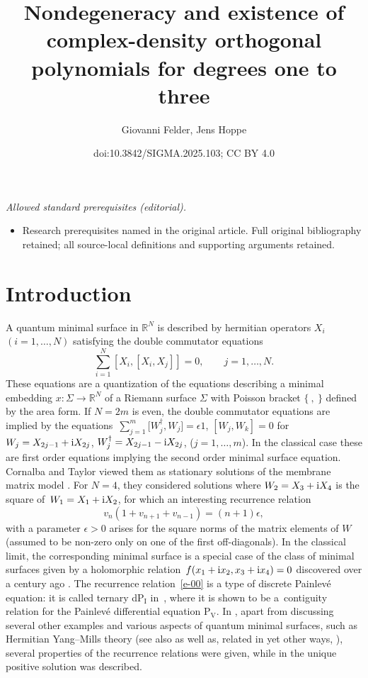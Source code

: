 \documentclass[10pt,a4paper]{amsart}
\title{Nondegeneracy and existence of complex-density orthogonal polynomials for degrees one to three}
\author{Giovanni Felder, Jens Hoppe}
\date{doi:10.3842/SIGMA.2025.103; CC BY 4.0}
\numberwithin{equation}{section}
\theoremstyle{definition}
\begin{document}
\maketitle
\noindent\textit{Allowed standard prerequisites (editorial).}\begin{itemize}
\item Research prerequisites named in the original article. Full original bibliography retained; all source-local definitions and supporting arguments retained.
\end{itemize}\medskip
\section{Introduction}
A quantum minimal surface \cite{Hoppe1982,Hoppe1996,IKKT1997} in $\mathbb R^N$ is described by hermitian operators $X_i$ $(i=1,\dots,N)$ satisfying the double commutator equations
\[
\sum_{i=1}^N[X_i,[X_i,X_j]]=0, \qquad j=1,\dots,N.
\]
These equations are a quantization of the equations  describing a minimal embedding $x\colon\Sigma\to \mathbb R^N$ of a Riemann surface $\Sigma$ with Poisson bracket $\{\ ,\ \}$ defined by the area form. If $N=2m$ is even, the double commutator equations are implied by the equations~${\sum_{j=1}^m\big[W_j^\dagger,W_j\big]=\epsilon 1}$, $[W_j,W_k]=0$ for $W_j=X_{2j-1}+{\rm i}X_{2j}$, $W_j^\dagger=X_{2j-1}-{\rm i}X_{2j}$, ($j=1,\dots,m$). In the classical case these are first order equations implying the second order minimal surface equation. Cornalba and Taylor \cite{CornalbaTaylor1999} viewed them as stationary solutions of the membrane matrix model \cite{Hoppe1982}. For $N=4$, they considered solutions where $W_2=X_3 + {\rm i} X_4$ is the square of~${W_1=X_1 +{\rm i} X_2}$, for which an interesting recurrence relation
\begin{equation}\label{e-00}
v_n(1+v_{n+1}+v_{n-1})=(n+1)\epsilon,
\end{equation}
with a parameter $\epsilon>0$ arises for the square norms of the matrix elements of $W$ (assumed to be non-zero only on one of the first off-diagonals). In the classical limit, the corresponding minimal surface is a special case of the class of minimal surfaces given by a holomorphic relation~${f(x_1+{\rm i}x_2,x_3+{\rm i}x_4)=0}$ discovered over a century ago \cite{Eisenhart1912,Kommerell1905}. The recurrence relation~\eqref{e-00} is a type of discrete Painlev\'e equation: it is called ternary dP${}_{\mathrm{I}}$ in~\cite{Tokihiro2002}, where it is shown to be a~contiguity relation for the Painlev\'e differential equation P${}_{\mathrm V}$.
In \cite{AHK2019}, apart from discussing several other examples and various aspects of quantum minimal surfaces, such as Hermitian Yang--Mills theory (see also \cite{Connes2002, Herscovich2011} as well as, related in yet other ways, \cite{ACH2016,AHH2012}), several properties of the recurrence relations were given, while in \cite{CDHM2025,Hoppe2025}
the unique positive solution was described.
\end{document}

